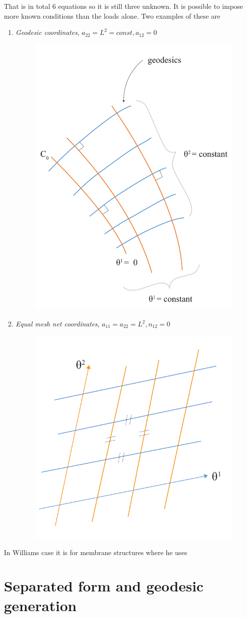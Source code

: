 That is in total 6 equations so it is still three unknown. It is possible to impose more known conditions than the loads alone. Two examples of these are
\vspace{5mm}
\begin{enumerate}
\item \textit{Geodesic coordinates}, $a_{22} = L^2 = const, a_{12}=0$
\begin{figure}[H]
\centering
\includegraphics[height=0.7\linewidth ]{figure/Theory/geodesicCoordRe.pdf}
\end{figure}
\item \textit{Equal mesh net coordinates}, $a_{11}= a_{22} = L^2, n_{12}=0$ 
\begin{figure}[H]
\centering
\includegraphics[height=0.4\linewidth ]{figure/Theory/equalMeshFrei.pdf}
\end{figure}
\end{enumerate}

In Williams case it is for membrane structures where he uses 
\section{Separated form and geodesic generation}

